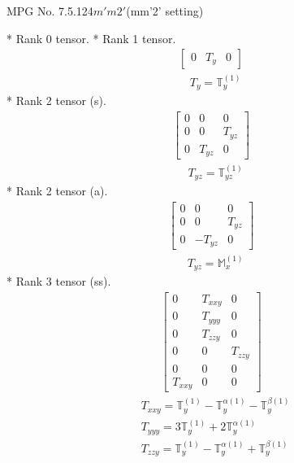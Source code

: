 \documentclass[fleqn,8pt,landscape]{jsarticle}
\begin{document}
\setcounter{MaxMatrixCols}{32}

\renewcommand{\tablename}{Table~}
\renewcommand{\figurename}{Figure~}
\begin{center}
\LARGE
MPG No. 7.5.124\quad$m'm2'$\quad(mm'2' setting)
\end{center}
* Rank 0 tensor.
* Rank 1 tensor.
\begin{align*}
\begin{bmatrix} 0 & T_{y} & 0 \end{bmatrix}
\end{align*}
\begin{align*}
& T_{y} = \mathbb{T}_{y}^{(1)}
\end{align*}
* Rank 2 tensor (s).
\begin{align*}
\begin{bmatrix} 0 & 0 & 0 \\ 0 & 0 & T_{yz} \\ 0 & T_{yz} & 0 \end{bmatrix}
\end{align*}
\begin{align*}
& T_{yz} = \mathbb{T}_{yz}^{(1)}
\end{align*}
* Rank 2 tensor (a).
\begin{align*}
\begin{bmatrix} 0 & 0 & 0 \\ 0 & 0 & T_{yz} \\ 0 & - T_{yz} & 0 \end{bmatrix}
\end{align*}
\begin{align*}
& T_{yz} = \mathbb{M}_{x}^{(1)}
\end{align*}
* Rank 3 tensor (ss).
\begin{align*}
\begin{bmatrix} 0 & T_{xxy} & 0 \\ 0 & T_{yyy} & 0 \\ 0 & T_{zzy} & 0 \\ 0 & 0 & T_{zzy} \\ 0 & 0 & 0 \\ T_{xxy} & 0 & 0 \end{bmatrix}
\end{align*}
\begin{align*}
& T_{xxy} = \mathbb{T}_{y}^{(1)} - \mathbb{T}_{y}^{\alpha(1)} - \mathbb{T}_{y}^{\beta(1)} \\
& T_{yyy} = 3 \mathbb{T}_{y}^{(1)} + 2 \mathbb{T}_{y}^{\alpha(1)} \\
& T_{zzy} = \mathbb{T}_{y}^{(1)} - \mathbb{T}_{y}^{\alpha(1)} + \mathbb{T}_{y}^{\beta(1)}
\end{align*}
\end{document}
